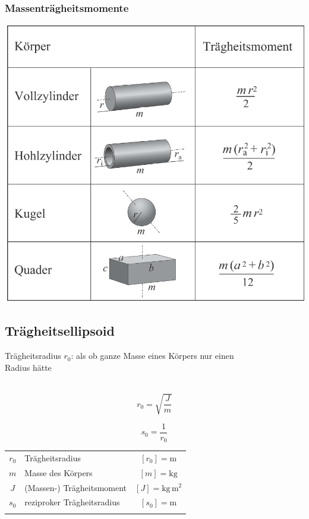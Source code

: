 	
	
	
	
	
	
	
	\subsubsection{Massenträgheitsmomente}
	
	\includegraphics[width=0.8\linewidth]{Bilder/massentraegheitsmomente}
	
	\vfill\null
	\columnbreak
	
	
	
	
	\subsection{Trägheitsellipsoid}
	
	Trägheitsradius $r_0$: als ob ganze Masse eines Körpers nur einen \\
	Radius hätte \\
	\\
	\begin{minipage}{0.48\linewidth}
	$$ \boxed{ r_0 = \sqrt{\frac{J}{m}}} $$
	
	\end{minipage}
	\hfill
	\begin{minipage}{0.48\linewidth}
	$$ \boxed{s_0 = \frac{1}{r_0} }$$
	\end{minipage}
	

	\begin{tabular}{c l c}
	$r_0$ & Trägheitsradius & $[r_0] = \mathrm{m}$ \\
	$m$ & Masse des Körpers & $[m] = \mathrm{kg}$ \\
	$J$ & (Massen-) Trägheitsmoment & $[J] = \mathrm{kg \, m^2}$ \\
	$s_0$ & reziproker Trägheitsradius & $[s_0] = \mathrm{m}$ \\
	\\
	\end{tabular}
	
